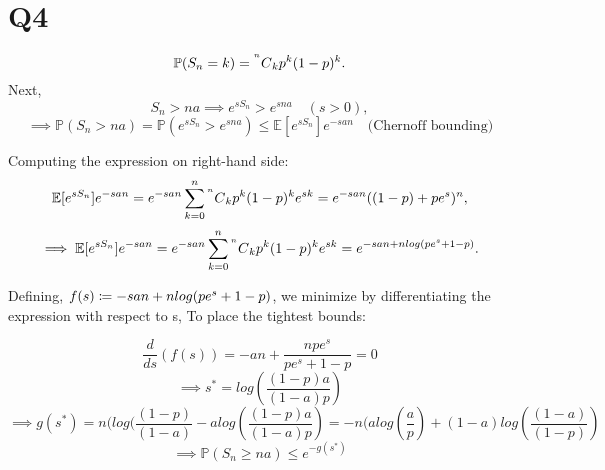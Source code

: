 \section{Q4}
\label{s:Q4}
$$\mathbb{P}(S_n = k) = \prescript{^n\mkern-0.5mu}{}C_{k}p^{k}(1-p)^{k}.$$
Next, 
$$S_n > na \implies e^{sS_n} > e^{sna} \quad (s > 0),$$
$$\implies \mathbb{P}(S_n > na) = \mathbb{P}(e^{sS_n} > e^{sna}) \leq \mathbb{E}[e^{sS_n}]e^{-san} \quad \text{(Chernoff bounding)}$$

Computing the expression on right-hand side:
$$\mathbb{E}[e^{sS_n}]e^{-san} = e^{-san}\sum_{k = 0}^{n}\prescript{^n\mkern-0.5mu}{}C_{k}p^{k}(1-p)^{k}e^{sk} = e^{-san}((1-p) + pe^{s})^{n},$$
$$
\implies \mathbb{E}[e^{sS_n}]e^{-san} = e^{-san}\sum_{k = 0}^{n}\prescript{^n\mkern-0.5mu}{}C_{k}p^{k}(1-p)^{k}e^{sk} = e^{-san + nlog(pe^s + 1-p)}.
$$

Defining, $f(s) \coloneqq -san + nlog(pe^s + 1-p)$, we minimize by differentiating the expression with respect to s, To place the tightest bounds:

$$\frac{d}{ds}(f(s)) = -an + \frac{npe^s}{pe^s + 1- p} = 0$$
$$\implies s^{*} = log(\frac{(1-p)a}{(1-a)p})$$
$$\implies g(s^{*}) = n(log(\frac{(1-p)}{(1-a)} - alog(\frac{(1-p)a}{(1-a)p}) = -n(alog(\frac{a}{p}) + (1-a)log(\frac{(1-a)}{(1-p)})$$
$$\implies \mathbb{P}(S_n \geq na) \leq e^{-g(s^{*})}$$
